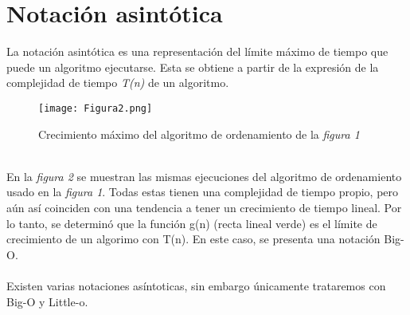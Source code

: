 \documentclass{article}
\begin{document}
\section{Notación asintótica}
La notación asintótica es una representación del límite máximo de tiempo que puede un algoritmo ejecutarse. Esta se obtiene a partir de la expresión de la complejidad de tiempo \textit{T(n)} de un algoritmo.
\\
\begin{figure}[h]
    \centering
    \texttt{[image: Figura2.png]}
    \caption{Crecimiento máximo del algoritmo de ordenamiento de la \textit{figura 1}}
    \label{fig:2}
\end{figure}
\\
En la \textit{figura 2} se muestran las mismas ejecuciones del algoritmo de ordenamiento usado en la \textit{figura 1}. Todas estas tienen una complejidad de tiempo propio, pero aún así coinciden con una tendencia a tener un crecimiento de tiempo lineal. Por lo tanto, se determinó que la función g(n) (recta lineal verde) es el límite de crecimiento de un algorimo con T(n). En este caso, se presenta una notación Big-O.
\\\\
Existen varias notaciones asíntoticas, sin embargo únicamente trataremos con Big-O y Little-o.
\end{document}
